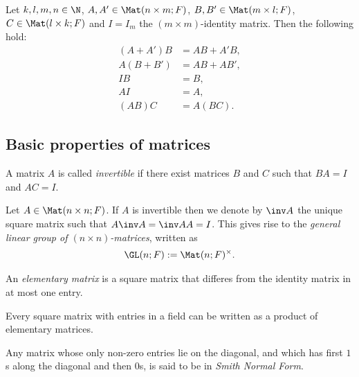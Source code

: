 \documentclass{article}
\begin{document}
\begin{proposition}[Notes 2.1.9]
    Let $k,l,m,n\in\N$, $A,A'\in\Mat(n\times m;F)$, $B,B'\in\Mat(m\times l;F)$,
    $C\in\Mat(l\times k; F)$ and $I=I_m$ the $(m\times m)$-identity matrix.
    Then the following hold:
    \begin{align*}
        (A+A')B & = AB + A'B, \\
        A(B+B') & = AB + AB', \\
        IB      & = B,        \\
        AI      & = A,        \\
        (AB)C   & = A(BC).
    \end{align*}
\end{proposition}

\subsection{Basic properties of matrices}

\begin{definition}
    A matrix $A$ is called \emph{invertible} if there exist matrices $B$ and $C$
    such that $BA=I$ and $AC=I$.
\end{definition}

\begin{definition}
    Let $A\in\Mat(n\times n;F)$. If $A$ is invertible then we denote by $\inv A$
    the unique square matrix such that $A\inv A=\inv AA=I$. This gives rise to the
    \emph{general linear group of $(n\times n)$-matrices}, written as
    \begin{align*}
        \GL(n;F) := \Mat(n;F)^\times.
    \end{align*}
\end{definition}

\begin{definition}
    An \emph{elementary matrix} is a square matrix that differes from the identity
    matrix in at most one entry.
\end{definition}

\begin{theorem}[Notes 2.2.3]
    Every square matrix with entries in a field can be written as a product of
    elementary matrices.
\end{theorem}

\begin{definition}
    Any matrix whose only non-zero entries lie on the diagonal, and which has
    first $1$s along the diagonal and then $0$s, is said to be in \emph{Smith Normal Form}.
\end{definition}
\end{document}

